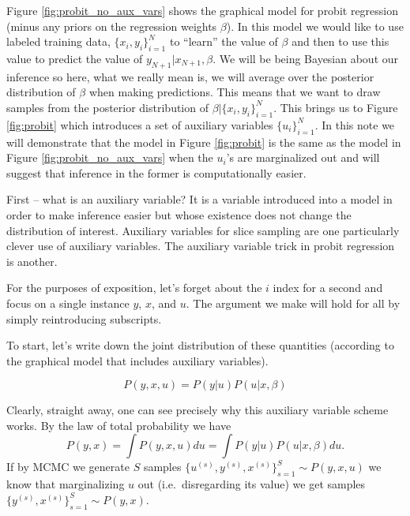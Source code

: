 Figure \ref{fig:probit_no_aux_vars} shows the graphical model for probit regression (minus any priors on the regression weights $\beta$).    In this model we would like to use labeled training data, $\{x_i, y_i\}_{i=1}^N$ to ``learn'' the value of $\beta$ and then to use this value to predict the value of $y_{N+1} | x_{N+1}, \beta.$  We will be being Bayesian about our inference so here, what we really mean is, we will average over the posterior distribution of $\beta$ when making predictions.  This means that we want to draw samples from the posterior distribution of $\beta | \{x_i, y_i\}_{i=1}^N$.  This brings us to Figure \ref{fig:probit} which introduces a set of auxiliary variables $\{u_i\}_{i=1}^N$.  In this note we will demonstrate that the model in  Figure \ref{fig:probit} is the same as the model in Figure \ref{fig:probit_no_aux_vars}  when the $u_i$'s are marginalized out and will suggest that inference in the former is computationally easier.  

First -- what is an auxiliary variable?  It is a variable introduced into a model in order to make inference easier but whose existence does not change the distribution of interest.  Auxiliary variables for slice sampling are one particularly clever use of auxiliary variables.  The auxiliary variable trick in probit regression is another.

For the purposes of exposition, let's forget about the $i$ index for a second and focus on a single instance $y$, $x$, and $u$.  The argument we make will hold for all by simply reintroducing subscripts.  

To start, let's write down the joint distribution of these quantities (according to the graphical model that includes auxiliary variables).

\begin{equation}
P(y,x,u) = P(y|u)P(u|x,\beta) \label{eqn:joint}
\end{equation}

Clearly, straight away, one can see precisely why this auxiliary variable scheme works.  By the law of total probability we have
\begin{equation}
P(y,x) = \int P(y,x,u)du= \int P(y|u)P(u|x,\beta)du.  \label{eqn:joint_marginalized}
\end{equation}
If by MCMC we generate $S$ samples $\{u^{(s)},y^{(s)},x^{(s)}\}_{s=1}^S \sim P(y,x,u)$ we know that marginalizing $u$ out (i.e.~disregarding its value) we get samples $\{y^{(s)},x^{(s)}\}_{s=1}^S \sim P(y,x).$  %


